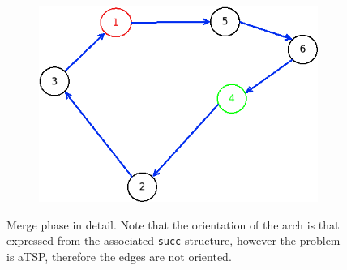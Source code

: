 \begin{figure}[!h]
\begin{subfigure}{.26\columnwidth}
		\caption{}
		\label{fig:patching_merge2}
	\end{subfigure}
	\hfill%
	\begin{subfigure}{.26\columnwidth}
		\includegraphics[width=\columnwidth]{img/patching_merge3.png}
		\caption{}
		\label{fig:patching_merge3}
	\end{subfigure}

	\caption{Merge phase in detail. Note that the orientation of the arch is that expressed from the associated \texttt{succ} structure, however the problem is aTSP, therefore the edges are not oriented.}
	\label{fig:patching_merge}
\end{figure}\\

